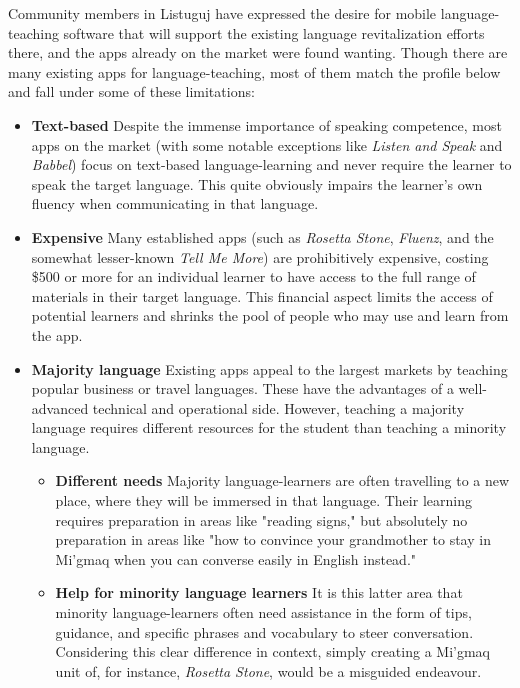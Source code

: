 \documentclass[12pt]{article} %
\begin{document}
Community members in Listuguj have expressed the desire for mobile language-teaching software that will support the existing language revitalization efforts there, and the apps already on the market were found wanting. Though there are many existing apps for language-teaching, most of them match the profile below and fall under some of these limitations:

\begin{itemize} 

\item {\bf Text-based} Despite the immense importance of speaking competence, most apps on the market  (with some notable exceptions like {\it Listen and Speak} and {\it Babbel}) focus on text-based language-learning and never require the learner to speak the target language. This quite obviously impairs the learner's own fluency when communicating in that language.

\item {\bf Expensive} Many established apps (such as {\it Rosetta Stone}, {\it Fluenz}, and the somewhat lesser-known {\it Tell Me More}) are prohibitively expensive, costing \$500 or more for an individual learner to have access to the full range of materials in their target language. This financial aspect limits the access of potential learners and shrinks the pool of people who may use and learn from the app.

\item {\bf Majority language} Existing apps appeal to the largest markets by teaching popular business or travel languages. These have the advantages of a well-advanced technical and operational side. However, teaching a majority language requires different resources for the student than teaching a minority language.  

	\begin{itemize}
	\item {\bf Different needs} Majority language-learners are often travelling to a new place, where they will be immersed in that language. Their learning requires preparation in areas like "reading signs," but absolutely no preparation in areas like "how to convince your grandmother to stay in Mi'gmaq when you can converse easily in English instead."

	\item {\bf Help for minority language learners} It is this latter area that minority language-learners often need assistance in the form of tips, guidance, and specific phrases and vocabulary to steer conversation. Considering this clear difference in context, simply creating a Mi'gmaq unit of, for instance, {\it Rosetta Stone}, would be a misguided endeavour.


\end{itemize}
\end{itemize}
\end{document}
